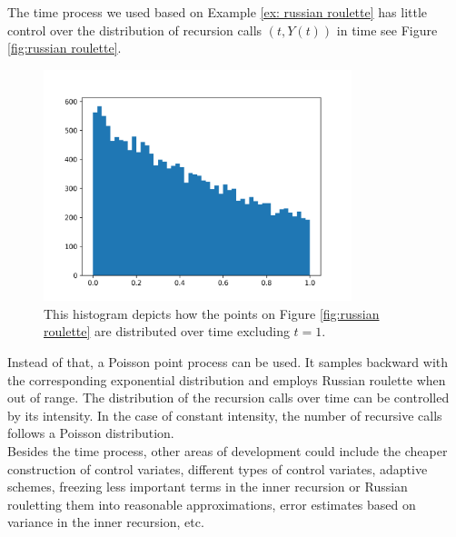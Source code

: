 \documentclass[a4paper,12pt]{article}
\begin{document}
\begin{pythonn}
\end{pythonn}

\vspace{0.5cm}

The time process we used based on Example \ref{ex: russian roulette}
has little control over the distribution of recursion calls $(t,Y(t))$
in time see Figure \ref{fig:russian roulette}.

\begin{figure}[h!]
    \centering
    \includegraphics[width=0.8\textwidth]{plots/time proces.png}
    \caption{This histogram depicts how the points
        on Figure \ref{fig:russian roulette} are distributed over time
        excluding $t=1$.}
    \label{fig:time proces}
\end{figure}

Instead of that, a Poisson point process can be used.
It samples backward with the corresponding
exponential distribution and employs Russian roulette
when out of range. The distribution of the recursion calls over time
can be controlled by its intensity.
In the case of constant intensity, the number of recursive calls
follows a Poisson distribution. \\

Besides the time process, other areas of development could
include the cheaper construction of control variates,
different types of control variates, adaptive schemes,
freezing less important terms in the inner recursion or Russian rouletting
them into reasonable approximations, error estimates based on variance in the
inner recursion, etc. \\
\end{document}
